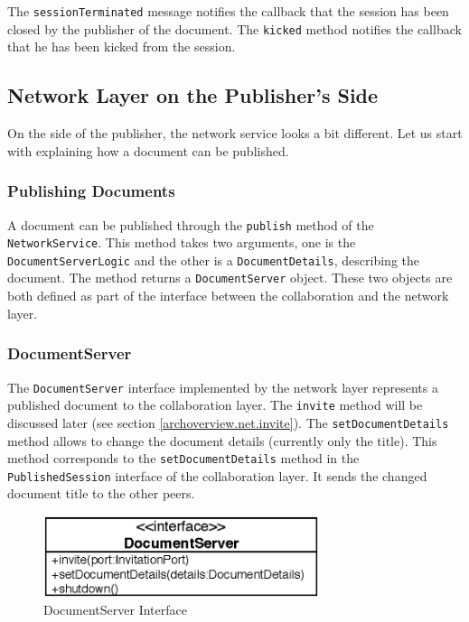 The \texttt{session\-Terminated} message notifies the callback that the 
session has been closed
by the publisher of the document. The \texttt{kicked} method notifies the
callback that he has been kicked from the session.


\subsection{Network Layer on the Publisher's Side}
On the side of the publisher, the network service looks a bit different.
Let us start with explaining how a document can be published.

\subsubsection{Publishing Documents}
A document can be published through the \texttt{publish} method of the
\texttt{Network\-Service}. This method takes two arguments, one is the
\texttt{Document\-Server\-Logic} and the other is a \texttt{Document\-Details},
describing the document. The method returns a \texttt{Document\-Server}
object. These two objects are both defined as part of the interface between the
collaboration and the network layer.

\subsubsection{DocumentServer}
The \texttt{Document\-Server} interface implemented by the network layer
represents a published document to the collaboration layer. The
\texttt{invite} method will be discussed later 
(see section \ref{archoverview.net.invite}). The \texttt{set\-Document\-Details}
method allows to change the document details (currently only the title).
This method corresponds to the \texttt{set\-Document\-Details} method in
the \texttt{Published\-Session} interface of the collaboration layer.
It sends the changed document title to the other peers.

\begin{figure}[H]
 \centering
 \includegraphics[width=8.08cm,height=2.40cm]{../images/finalreport/architecture_documentserver_uml.eps}
 \caption{DocumentServer Interface}
\end{figure}

